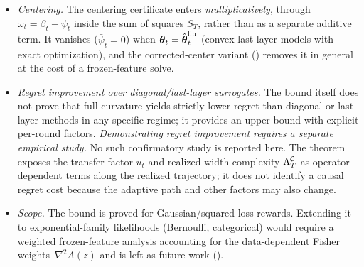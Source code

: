 \begin{itemize}[nosep,leftmargin=1.5em]
requires $E_T/T\to0$; a nonvanishing uniform per-round error bound alone yields
an $O(T)$ additive term.
\item \emph{Centering.}
The centering certificate enters \emph{multiplicatively}, through
$\omega_t=\bar\beta_t+\bar\psi_t$ inside the sum of squares $S_T$, rather than as
a separate additive term.  It vanishes
($\bar\psi_t=0$) when $\boldsymbol{\theta}_t=\hat{\boldsymbol{\theta}}_t^{\mathrm{lin}}$ (convex
last-layer models with exact optimization), and the corrected-center
variant () removes it in general at the cost of
a frozen-feature solve.
\item \emph{Regret improvement over diagonal/last-layer surrogates.}
The bound itself does not prove that full curvature yields strictly lower
regret than diagonal or last-layer methods in any specific regime; it
provides an upper bound with explicit per-round factors.
\emph{Demonstrating regret improvement requires a separate empirical study.}
No such confirmatory study is reported here.
The theorem exposes the transfer factor $u_t$ and
realized width complexity $\Lambda^{\mathcal{C}}_T$ as operator-dependent terms along the
realized trajectory; it does not identify a causal regret cost because the
adaptive path and other factors may also change.
\item \emph{Scope.}
The bound is proved for Gaussian/squared-loss rewards.
Extending it to exponential-family likelihoods (Bernoulli, categorical)
would require a weighted frozen-feature analysis accounting for the
data-dependent Fisher weights~$\nabla^2 A(z)$ and is left as future work
().
\end{itemize}

